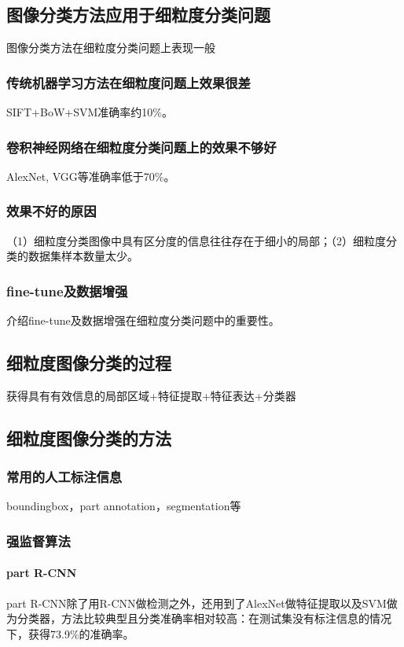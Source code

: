 \documentclass[UTF8]{article}
\begin{document}
\subsection{图像分类方法应用于细粒度分类问题}
图像分类方法在细粒度分类问题上表现一般
\subsubsection{传统机器学习方法在细粒度问题上效果很差}
SIFT+BoW+SVM准确率约10\%。
\subsubsection{卷积神经网络在细粒度分类问题上的效果不够好}
AlexNet, VGG等准确率低于70\%。

{\color{red}{ Experiments: AlexNet和VGG在CUB-Bird和Stanford Dog数据集上的表现。}}
\subsubsection{效果不好的原因}
（1）细粒度分类图像中具有区分度的信息往往存在于细小的局部；（2）细粒度分类的数据集样本数量太少。
\subsubsection{fine-tune及数据增强}
介绍fine-tune及数据增强在细粒度分类问题中的重要性。

{\color{red}{ Experiments: AlexNet和VGG在CUB-Bird和Stanford Dog数据集上经过ImageNet模型fine-tune后的表现。}}
\subsection{细粒度图像分类的过程}
获得具有有效信息的局部区域+特征提取+特征表达+分类器
\subsection{细粒度图像分类的方法}
\subsubsection{常用的人工标注信息}
boundingbox，part annotation，segmentation等
\subsubsection{强监督算法}
\paragraph{part R-CNN}
part R-CNN除了用R-CNN做检测之外，还用到了AlexNet做特征提取以及SVM做为分类器，方法比较典型且分类准确率相对较高：在测试集没有标注信息的情况下，获得73.9\%的准确率。
\end{document}
